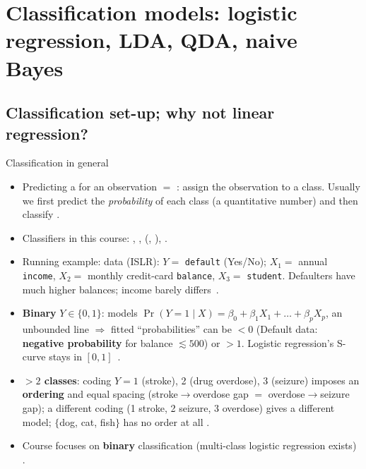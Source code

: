 \section{Classification models: logistic regression, LDA, QDA, naive Bayes}

\subsection{Classification set-up; why not linear regression?}

\begin{topic}{Classification in general}
\begin{itemize}
\item Predicting a  for an observation $=$ : assign the
  observation to a class. Usually we first predict the \emph{probability} of each class
  (a quantitative number) and then classify .
\item Classifiers in this course: , , 
  (, ), .
\item Running example:  data (ISLR): $Y=$ \texttt{default} (Yes/No);
  $X_1=$ annual \texttt{income}, $X_2=$ monthly credit-card \texttt{balance}, $X_3=$ \texttt{student}.
  Defaulters have much higher balances; income barely differs \,.
\end{itemize}
\end{topic}

\begin{keybox}
\begin{itemize}
\item \textbf{Binary} $Y\in\{0,1\}$:  models
  $\Pr(Y=1\mid X)=\beta_0+\beta_1X_1+\dots+\beta_pX_p$, an unbounded line
  $\Rightarrow$ fitted ``probabilities'' can be $<0$ (Default data: \textbf{negative probability} for
  balance $\lesssim 500$) or $>1$. Logistic regression's S-curve stays in $[0,1]$ \,.
\item \textbf{$>2$ classes}: coding $Y=1$ (stroke), 2 (drug overdose), 3 (seizure) imposes an
  \textbf{ordering} and equal spacing (stroke$\to$overdose gap $=$ overdose$\to$seizure gap); a different
  coding (1 stroke, 2 seizure, 3 overdose) gives a different model; $\{$dog, cat, fish$\}$ has no
  order at all .
\item Course focuses on \textbf{binary} classification (multi-class logistic regression exists) .
\end{itemize}
\end{keybox}

